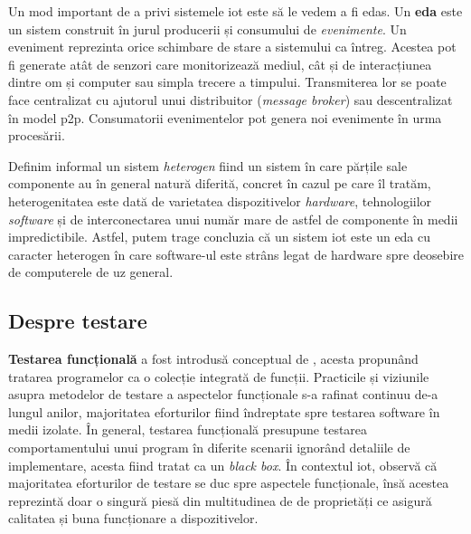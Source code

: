 

Un mod important de a privi sistemele \acrshort{iot} este să le vedem a fi \acrfull{edas}. Un \textbf{\acrshort{eda}} este un sistem construit în jurul producerii și consumului de \emph{evenimente}. Un eveniment reprezinta orice schimbare de stare a sistemului ca întreg. Acestea pot fi generate atât de senzori care monitorizează mediul, cât și de interacțiunea dintre om și computer sau simpla trecere a timpului. Transmiterea lor se poate face centralizat cu ajutorul unui distribuitor (\textit{message broker}) sau descentralizat în model \acrfull{p2p}. Consumatorii evenimentelor pot genera noi evenimente în urma procesării.

Definim informal un sistem \emph{heterogen} fiind un sistem în care părțile sale componente au în general natură diferită, concret în cazul pe care îl tratăm, heterogenitatea este dată de varietatea dispozitivelor \emph{hardware}, tehnologiilor \emph{software} și de interconectarea unui număr mare de astfel de componente în medii impredictibile. Astfel, putem trage concluzia că un sistem \acrshort{iot} este un \acrshort{eda} cu caracter heterogen în care software-ul este strâns legat de hardware spre deosebire de computerele de uz general. 


\subsection{Despre testare}


\textbf{Testarea funcțională} a fost introdusă conceptual de \cite{Howden1980}, acesta propunând tratarea programelor ca o colecție integrată de funcții. Practicile și viziunile asupra metodelor de testare a aspectelor funcționale s-a rafinat continuu de-a lungul anilor, majoritatea eforturilor fiind îndreptate spre testarea software în medii izolate. În general, testarea funcțională presupune testarea comportamentului unui program în diferite scenarii ignorând detaliile de implementare, acesta fiind tratat ca un \textit{black box}. În contextul \acrshort{iot}, \cite{Corts2019} observă că majoritatea eforturilor de testare se duc spre aspectele funcționale, însă acestea reprezintă doar o singură piesă din multitudinea de de proprietăți ce asigură calitatea și buna funcționare a dispozitivelor.

